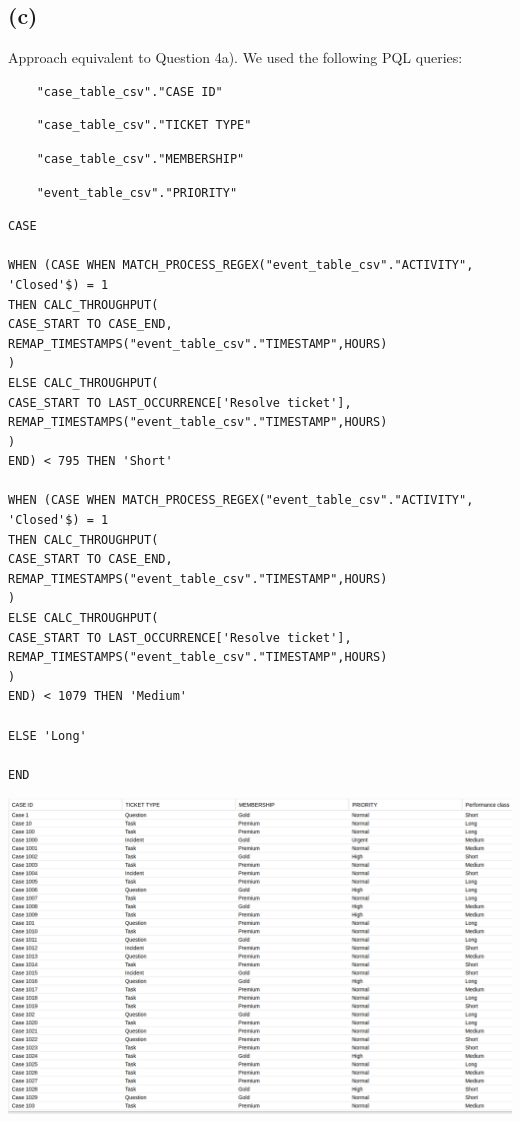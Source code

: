 \documentclass[../../main.tex]{subfiles}
\begin{document}
\subsection*{(c)}
Approach equivalent to Question 4a). We used the following PQL queries:
\begin{verbatim}
	"case_table_csv"."CASE ID"
\end{verbatim}
\begin{verbatim}
	"case_table_csv"."TICKET TYPE"
\end{verbatim}
\begin{verbatim}
	"case_table_csv"."MEMBERSHIP"
\end{verbatim}
\begin{verbatim}
	"event_table_csv"."PRIORITY"
\end{verbatim}
\begin{verbatim}
CASE

WHEN (CASE WHEN MATCH_PROCESS_REGEX("event_table_csv"."ACTIVITY", 'Closed'$) = 1
THEN CALC_THROUGHPUT(
CASE_START TO CASE_END,
REMAP_TIMESTAMPS("event_table_csv"."TIMESTAMP",HOURS)
)
ELSE CALC_THROUGHPUT(
CASE_START TO LAST_OCCURRENCE['Resolve ticket'],
REMAP_TIMESTAMPS("event_table_csv"."TIMESTAMP",HOURS)
)
END) < 795 THEN 'Short'

WHEN (CASE WHEN MATCH_PROCESS_REGEX("event_table_csv"."ACTIVITY", 'Closed'$) = 1
THEN CALC_THROUGHPUT(
CASE_START TO CASE_END,
REMAP_TIMESTAMPS("event_table_csv"."TIMESTAMP",HOURS)
)
ELSE CALC_THROUGHPUT(
CASE_START TO LAST_OCCURRENCE['Resolve ticket'],
REMAP_TIMESTAMPS("event_table_csv"."TIMESTAMP",HOURS)
)
END) < 1079 THEN 'Medium'

ELSE 'Long'

END
\end{verbatim}
\includegraphics[width=\columnwidth]{img/Celonis_c_Olap.png}
\end{document}
